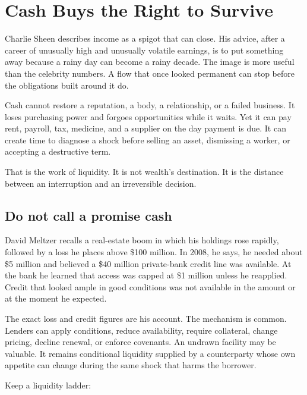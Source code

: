 \chapter{Cash Buys the Right to Survive}

Charlie Sheen describes income as a spigot that can close. His advice, after a
career of unusually high and unusually volatile earnings, is to put something
away because a rainy day can become a rainy decade. The image is more useful
than the celebrity numbers. A flow that once looked permanent can stop before
the obligations built around it do.

Cash cannot restore a reputation, a body, a relationship, or a failed business.
It loses purchasing power and forgoes opportunities while it waits. Yet it can
pay rent, payroll, tax, medicine, and a supplier on the day payment is due. It
can create time to diagnose a shock before selling an asset, dismissing a
worker, or accepting a destructive term.

That is the work of liquidity. It is not wealth's destination. It is the
distance between an interruption and an irreversible decision.

\section{Do not call a promise cash}

David Meltzer recalls a real-estate boom in which his holdings rose rapidly,
followed by a loss he places above \$100 million. In 2008, he says, he needed
about \$5 million and believed a \$40 million private-bank credit line was
available. At the bank he learned that access was capped at \$1 million unless
he reapplied. Credit that looked ample in good conditions was not available in
the amount or at the moment he expected.

The exact loss and credit figures are his account. The mechanism is common.
Lenders can apply conditions, reduce availability, require collateral, change
pricing, decline renewal, or enforce covenants. An undrawn facility may be
valuable. It remains conditional liquidity supplied by a counterparty whose
own appetite can change during the same shock that harms the borrower.

Keep a liquidity ladder:

